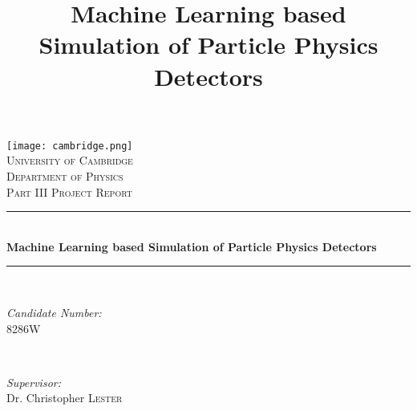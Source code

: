 \documentclass[twocolumn,twoside]{article}
\title{Machine Learning based Simulation of Particle Physics Detectors}
\date{\printdate{2017-05-15}}
\begin{document}
\begin{titlepage}
	
	\newcommand{\HRule}{\rule{\linewidth}{0.5mm}} %
	
	\center %
	
	\texttt{[image: cambridge.png]}\\[1cm] %
	\textsc{\LARGE University of Cambridge}\\[1.5cm]
	\textsc{\Large Department of Physics}\\[0.5cm]
	\textsc{\large Part III Project Report}\\[0.5cm]
	
	
	\HRule \\[0.4cm]
	{ \huge \bfseries Machine Learning based Simulation of Particle Physics Detectors}\\[0.4cm] %
	\HRule \\[1.5cm]
	
	
	\begin{minipage}{0.4\textwidth}
		\begin{flushleft} \large
			\emph{Candidate Number:}\\
			8286W
		\end{flushleft}
	\end{minipage}
	~
	\begin{minipage}{0.4\textwidth}
		\begin{flushright} \large
			\emph{Supervisor:} \\
			Dr. Christopher \textsc{Lester} %
		\end{flushright}
	\end{minipage}\\[2in]
	
	

\end{titlepage}
\end{document}
